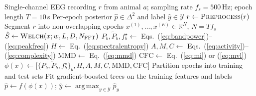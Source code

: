 

\begin{algorithm}[t]
\caption{Vigilance-state classification pipeline}
\label{alg:pipeline}
\begin{algorithmic}[1]
\REQUIRE Single-channel EEG recording $r$ from animal $a$; sampling rate
         $f_s = 500$\,Hz; epoch length $T = 10$\,s
\ENSURE  Per-epoch posterior $\hat{p} \in \Delta^{2}$ and label
         $\hat{y} \in \mathcal{Y}$
\STATE $r \leftarrow \textsc{Preprocess}(r)$
\STATE Segment $r$ into non-overlapping epochs
       $x^{(1)}, \dots, x^{(E)} \in \mathbb{R}^{N}$, $N = T f_s$
  \STATE $\hat{S} \leftarrow \textsc{Welch}(x; w, L, D, N_{\mathrm{FFT}})$
    \STATE $P_b, \tilde{P}_b, f_b^{\star} \leftarrow$
           Eqs.~(\ref{eq:bandpower})--(\ref{eq:peakfreq})
  \ENDFOR
  \STATE $H \leftarrow$ Eq.~(\ref{eq:spectralentropy})
  \STATE $A, M, C \leftarrow$ Eqs.~(\ref{eq:activity})--(\ref{eq:complexity})
  \STATE $\mathrm{MMD} \leftarrow$ Eq.~(\ref{eq:mmd})
  \STATE $\mathrm{CFC} \leftarrow$ Eq.~(\ref{eq:mi}) or (\ref{eq:mvl})
  \STATE $\phi(x) \leftarrow
          \big[\{P_b, \tilde{P}_b, f_b^{\star}\}_b, H, A, M, C,
          \mathrm{MMD}, \mathrm{CFC}\big]$
\ENDFOR
\STATE Partition epochs into training and test sets
\STATE Fit gradient-boosted trees \citep{Chen_2016} on the training
       features and labels
\STATE $\hat{p} \leftarrow f(\phi(x))$;\;
       $\hat{y} \leftarrow \operatorname*{arg\,max}_{y \in \mathcal{Y}} \hat{p}_y$
\end{algorithmic}
\end{algorithm}
